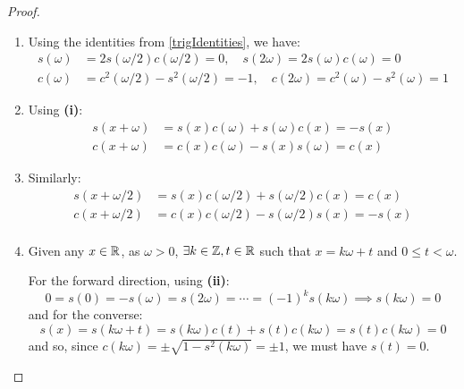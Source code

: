 \documentclass[../main.tex]{subfiles}
\begin{document}
\begin{proof}
  \begin{enumerate}
    \item Using the identities from \cref{trigIdentities}, we have:
      \begin{align*}
        s(\omega) &= 2s(\omega/2)c(\omega/2) = 0, \quad
        s(2\omega) = 2s(\omega)c(\omega) = 0 \\
        c(\omega) &= c^2(\omega/2) - s^2(\omega/2) = -1, \quad
        c(2\omega) = c^2(\omega) - s^2(\omega) = 1
      \end{align*}
    \item Using \textbf{(i)}:
      \begin{align*}
        s(x + \omega) &= s(x)c(\omega) + s(\omega)c(x) = -s(x) \\
        c(x + \omega) &= c(x)c(\omega) - s(x)s(\omega) = c(x)
      \end{align*}
    \item Similarly:
      \begin{align*}
        s(x + \omega/2) &= s(x)c(\omega/2) + s(\omega/2)c(x) = c(x) \\
        c(x + \omega/2) &= c(x)c(\omega/2) - s(\omega/2)s(x) = -s(x) \\
      \end{align*}
    \item Given any $x \in \mathbb{R}$, as $\omega > 0$, $\exists k \in \mathbb{Z}, t \in \mathbb{R}$ such that $x = k\omega + t$ and $0 \leq t < \omega$.

      For the forward direction, using \textbf{(ii)}:
      \[
        0 = s(0) = -s(\omega) = s(2\omega) = \cdots = (-1)^{k}s(k\omega) \implies s(k\omega) = 0
      \]
      and for the converse:
      \[
        s(x) = s(k\omega + t) = s(k\omega)c(t) + s(t)c(k\omega) = s(t)c(k\omega) = 0
      \]
      and so, since $c(k\omega) = \pm \sqrt{1 - s^2(k\omega)} = \pm 1$, we must have $s(t) = 0$.


\end{enumerate}
\end{proof}
\end{document}
